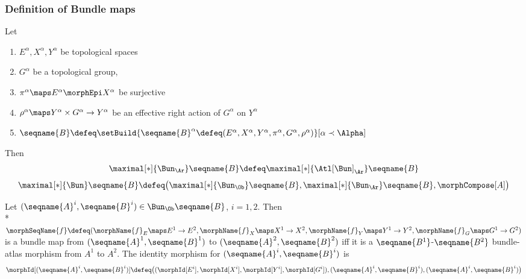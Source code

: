 \documentclass{article}
\begin{document}
\subsubsection{Definition of Bundle maps}
\begin{definition}
\label{def:Bun-map}
Let \\
\begin{enumerate}
\item
$E^\alpha, X^\alpha, Y^\alpha$ be topological spaces

\item
$G^\alpha$ be a topological group,

\item
$\pi^\alpha \maps E^\alpha \morphEpi X^\alpha$ be surjective

\item
$\rho^\alpha \maps Y^\alpha \times G^\alpha \to Y^\alpha$ be an
effective right action of $G^\alpha$ on $Y^\alpha$

\item
$
  \seqname{B}
  \defeq
  \setBuild
    {{
      \seqname{B}^\alpha \defeq
      (
        E^\alpha,
        X^\alpha,
        Y^\alpha,
        \pi^\alpha,
        G^\alpha,
        \rho^\alpha
      )
    }}%
    [
      \alpha \prec \Alpha
    ]
$
\end{enumerate}

Then
\begin{multline}
\maximal[*]{\Bun_\Ar} \seqname{B} \defeq \maximal[*]{\Atl[\Bun]_\Ar} \seqname{B}
\end{multline}
\begin{multline}
\maximal[*]{\Bun} \seqname{B}
\defeq
  \bigl (
    \maximal[*]{\Bun_\Ob} \seqname{B},
    \maximal[*]{\Bun_\Ar} \seqname{B},
    \morphCompose[A]
  \bigr )
\end{multline}

Let $(\seqname{A}^i,\seqname{B}^i) \in \Bun_\Ob \seqname{B}$, $i=1,2$.
Then  \\*
$
  \morphSeqName{f}
  \defeq
  (
    \morphName{f}_E \maps E^1 \to E^2,
    \morphName{f}_X \maps X^1 \to X^2,
    \morphName{f}_Y \maps Y^1 \to Y^2,
    \morphName{f}_G \maps G^1 \to G^2
  )
$
is a bundle map from $(\seqname{A}^1,\seqname{B}^1)$ to
$(\seqname{A}^2,\seqname{B}^2)$ iff it is a
$\seqname{B^1}$-$\seqname{B^2}$ bundle-atlas morphism from $A^1$ to
$A^2$. The identity morphism for $(\seqname{A}^i,\seqname{B}^i)$ is
\begin{equation}
\morphId[{{(\seqname{A}^i,\seqname{B}^i)}}] \defeq
\bigl (
  (\morphId[E^i], \morphId[X^i], \morphId[Y^i], \morphId[G^i]),
  (\seqname{A}^i,\seqname{B}^i),
  (\seqname{A}^i,\seqname{B}^i)
\bigr )
\end{equation}
\end{definition}
\end{document}
